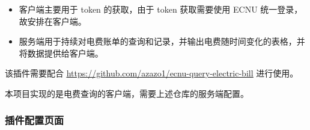 \documentclass[14pt,a4paper,UTF8,twoside]{article}
\begin{document}
\begin{itemize}
    \item 客户端主要用于 token 的获取，由于 token 获取需要使用 ECNU 统一登录，故安排在客户端。
    \item 服务端用于持续对电费账单的查询和记录，并输出电费随时间变化的表格，并将数据提供给客户端。
\end{itemize}

\begin{note}
    该插件需要配合 \href{https://github.com/azazo1/ecnu-query-electric-bill}{\underline{https://github.com/azazo1/ecnu-query-electric-bill}} 进行使用。

    本项目实现的是电费查询的客户端，需要上述仓库的服务端配置。
\end{note}

\newpage{}

\subsubsection{插件配置页面}
\end{document}
